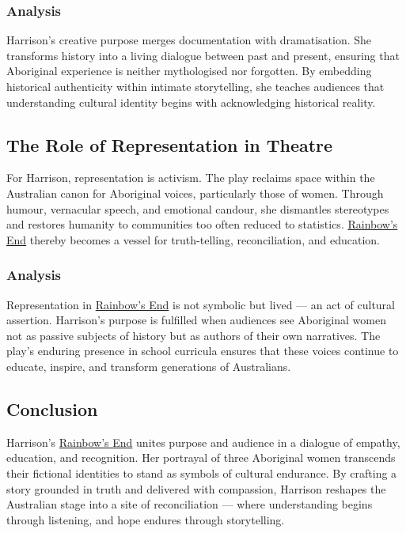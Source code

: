 \documentclass[a4paper]{article}
\begin{document}
\subsubsection{Analysis}
Harrison’s creative purpose merges documentation with dramatisation. She transforms history into a living dialogue between past and present, ensuring that Aboriginal experience is neither mythologised nor forgotten. By embedding historical authenticity within intimate storytelling, she teaches audiences that understanding cultural identity begins with acknowledging historical reality.\\

\subsection{The Role of Representation in Theatre}
For Harrison, representation is activism. The play reclaims space within the Australian canon for Aboriginal voices, particularly those of women. Through humour, vernacular speech, and emotional candour, she dismantles stereotypes and restores humanity to communities too often reduced to statistics. \underline{Rainbow's End} thereby becomes a vessel for truth-telling, reconciliation, and education.\\

\subsubsection{Analysis}
Representation in \underline{Rainbow's End} is not symbolic but lived — an act of cultural assertion. Harrison’s purpose is fulfilled when audiences see Aboriginal women not as passive subjects of history but as authors of their own narratives. The play’s enduring presence in school curricula ensures that these voices continue to educate, inspire, and transform generations of Australians.\\

\subsection{Conclusion}
Harrison’s \underline{Rainbow's End} unites purpose and audience in a dialogue of empathy, education, and recognition. Her portrayal of three Aboriginal women transcends their fictional identities to stand as symbols of cultural endurance. By crafting a story grounded in truth and delivered with compassion, Harrison reshapes the Australian stage into a site of reconciliation — where understanding begins through listening, and hope endures through storytelling.\\
\end{document}
